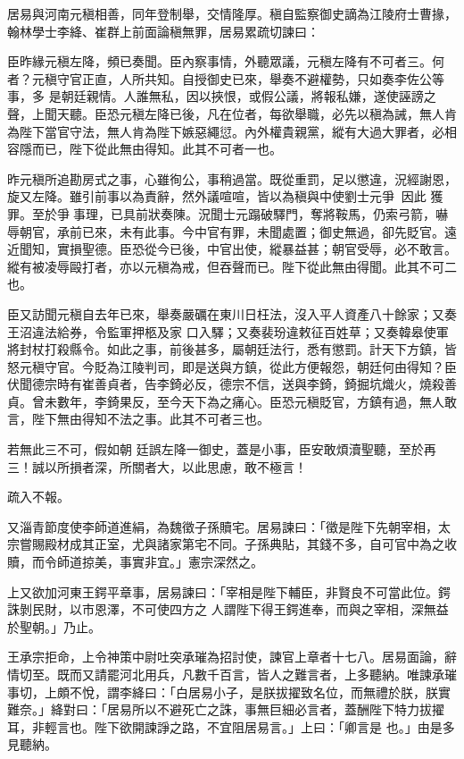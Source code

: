 \begin{pinyinscope}
 居易與河南元稹相善，同年登制舉，交情隆厚。稹自監察御史謫為江陵府士曹掾，翰林學士李絳、崔群上前面論稹無罪，居易累疏切諫曰：



 臣昨緣元稹左降，頻已奏聞。臣內察事情，外聽眾議，元稹左降有不可者三。何者？元稹守官正直，人所共知。自授御史已來，舉奏不避權勢，只如奏李佐公等事，多
 是朝廷親情。人誰無私，因以挾恨，或假公議，將報私嫌，遂使誣謗之聲，上聞天聽。臣恐元稹左降已後，凡在位者，每欲舉職，必先以稹為誡，無人肯為陛下當官守法，無人肯為陛下嫉惡繩愆。內外權貴親黨，縱有大過大罪者，必相容隱而已，陛下從此無由得知。此其不可者一也。



 昨元稹所追勘房式之事，心雖徇公，事稍過當。既從重罰，足以懲違，況經謝恩，旋又左降。雖引前事以為責辭，然外議喧喧，皆以為稹與中使劉士元爭，因此
 獲罪。至於爭事理，已具前狀奏陳。況聞士元蹋破驛門，奪將鞍馬，仍索弓箭，嚇辱朝官，承前已來，未有此事。今中官有罪，未聞處置；御史無過，卻先貶官。遠近聞知，實損聖德。臣恐從今已後，中官出使，縱暴益甚；朝官受辱，必不敢言。縱有被凌辱毆打者，亦以元稹為戒，但吞聲而已。陛下從此無由得聞。此其不可二也。



 臣又訪聞元稹自去年已來，舉奏嚴礪在東川日枉法，沒入平人資產八十餘家；又奏王沼違法給券，令監軍押柩及家
 口入驛；又奏裴玢違敕征百姓草；又奏韓皋使軍將封杖打殺縣令。如此之事，前後甚多，屬朝廷法行，悉有懲罰。計天下方鎮，皆怒元稹守官。今貶為江陵判司，即是送與方鎮，從此方便報怨，朝廷何由得知？臣伏聞德宗時有崔善貞者，告李錡必反，德宗不信，送與李錡，錡掘坑熾火，燒殺善貞。曾未數年，李錡果反，至今天下為之痛心。臣恐元稹貶官，方鎮有過，無人敢言，陛下無由得知不法之事。此其不可者三也。



 若無此三不可，假如朝
 廷誤左降一御史，蓋是小事，臣安敢煩瀆聖聽，至於再三！誠以所損者深，所關者大，以此思慮，敢不極言！



 疏入不報。



 又淄青節度使李師道進絹，為魏徵子孫贖宅。居易諫曰：「徵是陛下先朝宰相，太宗嘗賜殿材成其正室，尤與諸家第宅不同。子孫典貼，其錢不多，自可官中為之收贖，而令師道掠美，事實非宜。」憲宗深然之。



 上又欲加河東王鍔平章事，居易諫曰：「宰相是陛下輔臣，非賢良不可當此位。鍔誅剝民財，以市恩澤，不可使四方之
 人謂陛下得王鍔進奉，而與之宰相，深無益於聖朝。」乃止。



 王承宗拒命，上令神策中尉吐突承璀為招討使，諫官上章者十七八。居易面論，辭情切至。既而又請罷河北用兵，凡數千百言，皆人之難言者，上多聽納。唯諫承璀事切，上頗不悅，謂李絳曰：「白居易小子，是朕拔擢致名位，而無禮於朕，朕實難奈。」絳對曰：「居易所以不避死亡之誅，事無巨細必言者，蓋酬陛下特力拔擢耳，非輕言也。陛下欲開諫諍之路，不宜阻居易言。」上曰：「卿言是
 也。」由是多見聽納。




\end{pinyinscope}
